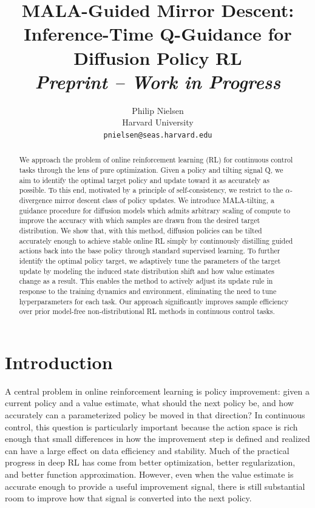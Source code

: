 \documentclass{article}
\title{MALA-Guided Mirror Descent:\\Inference-Time Q-Guidance for Diffusion Policy RL\\[0.5em]\normalsize\textit{Preprint -- Work in Progress}}
\author{%
  Philip Nielsen \\
  Harvard University\\
  \texttt{pnielsen@seas.harvard.edu} \\
}
\theoremstyle{plain}
\theoremstyle{definition}
\theoremstyle{remark}
\begin{document}
\maketitle

\begin{abstract}
We approach the problem of online reinforcement learning (RL) for continuous control tasks through the lens of pure optimization. Given a policy and tilting signal Q, we aim to identify the optimal target policy and update toward it as accurately as possible. 
To this end, motivated by a principle of self-consistency, we restrict to the $\alpha$-divergence mirror descent class of policy updates. 
We introduce MALA-tilting, a guidance procedure for diffusion models which admits arbitrary scaling of compute to improve the accuracy with which samples are drawn from the desired target distribution. We show that, with this method, diffusion policies can be tilted accurately enough to achieve stable online RL simply by continuously distilling guided actions back into the base policy through standard supervised learning. 
To further identify the optimal policy target, we adaptively tune the parameters of the target update by modeling the induced state distribution shift and how value estimates change as a result. This enables the method to actively adjust its update rule in response to the training dynamics and environment, eliminating the need to tune hyperparameters for each task.
Our approach significantly improves sample efficiency over prior model-free non-distributional RL methods in continuous control tasks.
\end{abstract}

\section{Introduction}
\label{sec:intro}

A central problem in online reinforcement learning is policy improvement: given a current policy and a value estimate, what should the next policy be, and how accurately can a parameterized policy be moved in that direction? In continuous control, this question is particularly important because the action space is rich enough that small differences in how the improvement step is defined and realized can have a large effect on data efficiency and stability. Much of the practical progress in deep RL has come from better optimization, better regularization, and better function approximation. However, even when the value estimate is accurate enough to provide a useful improvement signal, there is still substantial room to improve how that signal is converted into the next policy.
\end{document}
